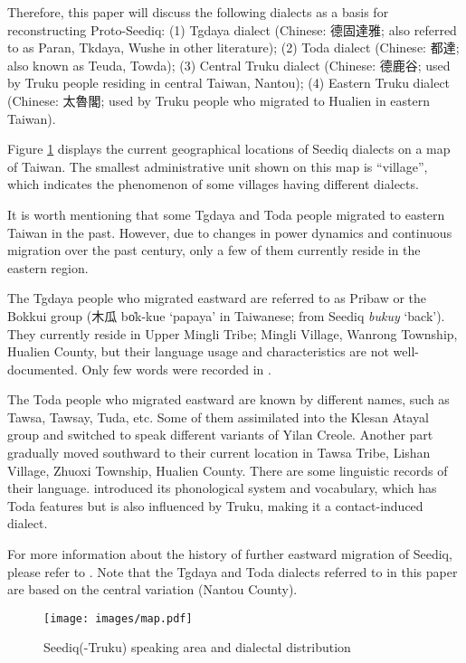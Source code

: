 \documentclass[12pt]{article}
\newcommand{\psedf}{Proto-Seediq\xspace}
\begin{document}
Therefore, this paper will discuss the following dialects as a basis for reconstructing \psedf: (1) Tgdaya dialect (Chinese: 德固達雅; also referred to as Paran, Tkdaya, Wushe in other literature); (2) Toda dialect (Chinese: 都達; also known as Teuda, Towda); (3) Central Truku dialect (Chinese: 德鹿谷; used by Truku people residing in central Taiwan, Nantou); (4) Eastern Truku dialect (Chinese: 太魯閣; used by Truku people who migrated to Hualien in eastern Taiwan).

Figure \ref{fig:sedmap} displays the current geographical locations of Seediq dialects on a map of Taiwan. The smallest administrative unit shown on this map is ``village'', which indicates the phenomenon of some villages having different dialects. 

It is worth mentioning that some Tgdaya and Toda people migrated to eastern Taiwan in the past. However, due to changes in power dynamics and continuous migration over the past century, only a few of them currently reside in the eastern region. 

The Tgdaya people who migrated eastward are referred to as Pribaw or the Bokkui group (木瓜 bo̍k-kue `papaya' in Taiwanese; from Seediq \textit{bukuy} `back'). They currently reside in  Upper Mingli Tribe; Mingli Village, Wanrong Township, Hualien County, but their language usage and characteristics are not well-documented. Only few words were recorded in \textcite{tashiro1900easterntw}.

The Toda people who migrated eastward are known by different names, such as Tawsa, Tawsay, Tuda, etc. Some of them assimilated into the Klesan Atayal group and switched to speak different variants of Yilan Creole. Another part gradually moved southward to their current location in Tawsa Tribe, Lishan Village, Zhuoxi Township, Hualien County. There are some linguistic records of their language. \textcite{lee2012tawsa} introduced its phonological system and vocabulary, which has Toda features but is also influenced by Truku, making it a contact-induced dialect. 

For more information about the history of further eastward migration of Seediq, please refer to \textcite{liao1977Sedtheruy,liao1978Sedtheruy}. Note that the Tgdaya and Toda dialects referred to in this paper are based on the central variation (Nantou County).

\begin{figure}[!t]
    \centering
    \texttt{[image: images/map.pdf]}
    \caption{Seediq(-Truku) speaking area and dialectal distribution}
    \label{fig:sedmap}
\end{figure}
    
\end{document}
